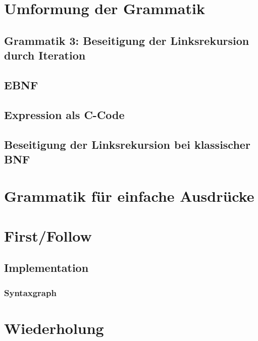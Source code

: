 
\section{Umformung der Grammatik}

\subsection{Grammatik 3: Beseitigung der Linksrekursion durch Iteration}

\subsection{EBNF}

\subsection{Expression als C-Code}

\subsection{Beseitigung der Linksrekursion bei klassischer BNF}

\section{Grammatik für einfache Ausdrücke}

\section{First/Follow}
\subsection{Implementation}
\subsubsection*{Syntaxgraph}

\section{Wiederholung}






